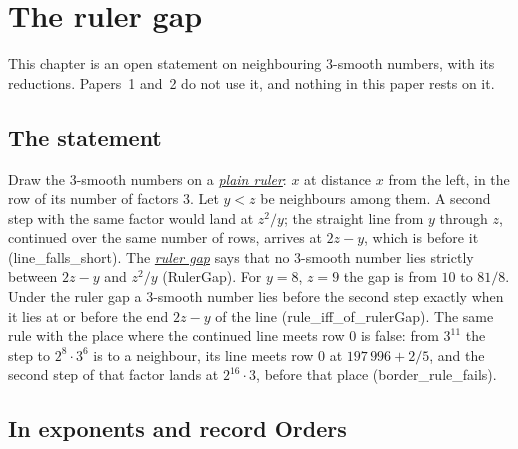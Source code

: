 \documentclass[10pt,a4paper,titlepage]{article}
\makeatletter
\newcommand{\termhere}[1]{\leavevmode
  \Hy@raisedlink{\hyper@anchorstart{term:#1}\hyper@anchorend}}
\newcommand{\keyterm}[2]{\hyperlink{box:#1}{\emph{#2}}}
\newcommand{\lean}[1]{\textsf{#1}}
\makeatother
\begin{document}
\section{The ruler gap}
\label{sec:ruler}

This chapter is an open statement on neighbouring $3$-smooth numbers, with its reductions.
Papers~1 and~2 do not use it, and nothing in this paper rests on it.

\subsection*{The statement}

\termhere{ruler}\termhere{rulergap}Draw the $3$-smooth numbers on a \keyterm{ruler}{plain ruler}: $x$ at distance $x$ from the left, in the row
of its number of factors $3$. Let $y < z$ be neighbours among them. A second step with the
same factor would land at $z^2/y$; the straight line from $y$ through $z$, continued over
the same number of rows, arrives at $2z - y$, which is before it
(\lean{line\_falls\_short}). The \keyterm{rulergap}{ruler gap} says that no $3$-smooth number lies
strictly between $2z - y$ and $z^2/y$ (\lean{RulerGap}). For $y = 8$, $z = 9$ the gap is
from $10$ to $81/8$. Under the ruler gap a $3$-smooth number lies before the second step
exactly when it lies at or before the end $2z - y$ of the line
(\lean{rule\_iff\_of\_rulerGap}). The same rule with the place where the continued line
meets row $0$ is false: from $3^{11}$ the step to $2^8 \cdot 3^6$ is to a neighbour, its
line meets row $0$ at $197\,996 + 2/5$, and the second step of that factor lands at
$2^{16} \cdot 3$, before that place (\lean{border\_rule\_fails}).

\subsection*{In exponents and record Orders}
\end{document}
